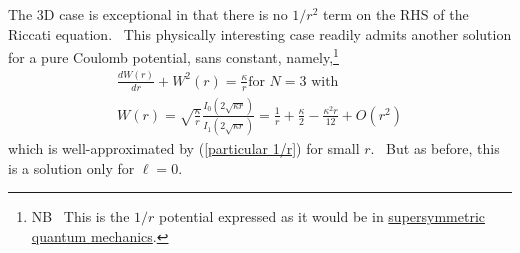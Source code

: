 \documentclass{article}%
\begin{document}
The 3D case is exceptional in that there is no $1/r^{2}$ term on the RHS of
the Riccati equation. \ This physically interesting case readily admits
another solution for a pure Coulomb potential, sans constant,
namely,\footnote{NB \ This is the $1/r$ potential expressed as it would be in
\href{https://en.wikipedia.org/wiki/Supersymmetric_quantum_mechanics}{supersymmetric
quantum mechanics}.}%
\begin{gather}
\frac{dW\left(  r\right)  }{dr}+W^{2}\left(  r\right)  =\frac{\kappa}{r}\text{
\ \ for \ \ }N=3\text{ \ \ with}\nonumber\\
W\left(  r\right)  =\sqrt{\frac{\kappa}{r}}\frac{I_{0}\left(  2\sqrt{\kappa
r}\right)  }{I_{1}\left(  2\sqrt{\kappa r}\right)  }=\frac{1}{r}+\frac{\kappa
}{2}-\frac{\kappa^{2}r}{12}+O\left(  r^{2}\right)
\end{gather}
which is well-approximated by (\ref{particular 1/r}) for small $r$. \ But as
before, this is a solution only for $\ell=0$.
\end{document}
